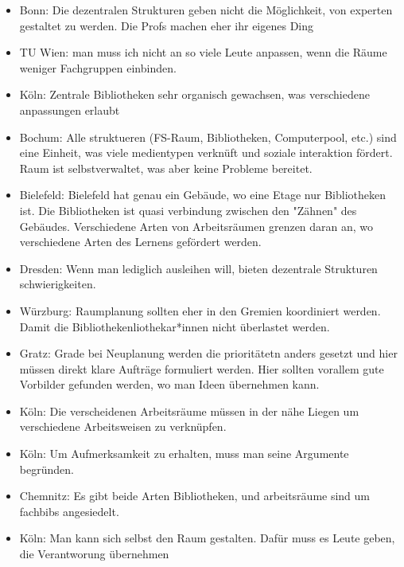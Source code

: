 \begin{itemize}
      \item Bonn: Die dezentralen Strukturen geben nicht die Möglichkeit, von experten gestaltet zu werden. Die Profs machen eher ihr eigenes Ding

      \item TU Wien: man muss ich nicht an so viele Leute anpassen, wenn die Räume weniger Fachgruppen einbinden.

      \item Köln: Zentrale Bibliotheken sehr organisch gewachsen, was verschiedene anpassungen erlaubt

      \item Bochum: Alle struktueren (FS-Raum, Bibliotheken, Computerpool, etc.) sind eine Einheit, was viele medientypen verknüft und soziale interaktion fördert. Raum ist selbstverwaltet, was aber keine Probleme bereitet.

      \item Bielefeld: Bielefeld hat genau ein Gebäude, wo eine Etage nur Bibliotheken ist. Die Bibliotheken ist quasi verbindung zwischen den "Zähnen" des Gebäudes. Verschiedene Arten von Arbeitsräumen grenzen daran an, wo verschiedene Arten des Lernens gefördert werden.

      \item Dresden: Wenn man lediglich ausleihen will, bieten dezentrale Strukturen schwierigkeiten.

      \item Würzburg: Raumplanung sollten eher in den Gremien koordiniert werden. Damit die Bibliothekenliothekar*innen nicht überlastet werden.

      \item Gratz: Grade bei Neuplanung werden die prioritätetn anders gesetzt und hier müssen direkt klare Aufträge formuliert werden. Hier sollten vorallem gute Vorbilder gefunden werden, wo man Ideen übernehmen kann.

      \item Köln: Die verscheidenen Arbeitsräume müssen in der nähe Liegen um verschiedene Arbeitsweisen zu verknüpfen.

      \item Köln: Um Aufmerksamkeit zu erhalten, muss man seine Argumente begründen.

      \item Chemnitz: Es gibt beide Arten Bibliotheken, und arbeitsräume sind um fachbibs angesiedelt.

      \item Köln: Man kann sich selbst den Raum gestalten. Dafür muss es Leute geben, die Verantworung übernehmen


\end{itemize}
